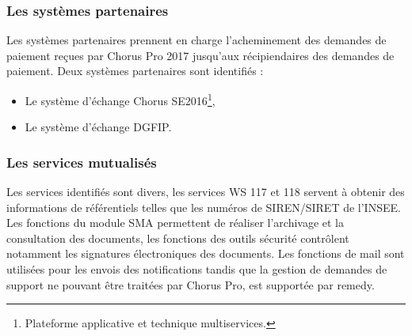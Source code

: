 \documentclass[12pt,a4paper]{article}
\begin{document}
\subsubsection{Les systèmes partenaires}
Les systèmes partenaires prennent en charge l’acheminement des demandes de paiement reçues par Chorus Pro 2017 jusqu’aux récipiendaires des demandes de paiement. Deux systèmes partenaires sont identifiés :
\smallbreak
\begin{itemize}
\item	Le système d’échange Chorus SE2016\footnote{Plateforme applicative et technique multiservices.},
\item	Le système d’échange DGFIP.
\end{itemize}
\medbreak
\subsubsection{Les services mutualisés}
Les services identifiés sont divers, les services WS 117 et 118 servent à obtenir des informations de référentiels telles que les numéros de SIREN/SIRET de l’INSEE. Les fonctions du module SMA permettent de réaliser l’archivage et la consultation des documents, les fonctions des outils sécurité contrôlent notamment les signatures électroniques des documents. Les fonctions de mail sont utilisées pour les envois des notifications tandis que la gestion de demandes de support ne pouvant être traitées par Chorus Pro, est supportée par remedy. 
\end{document}
